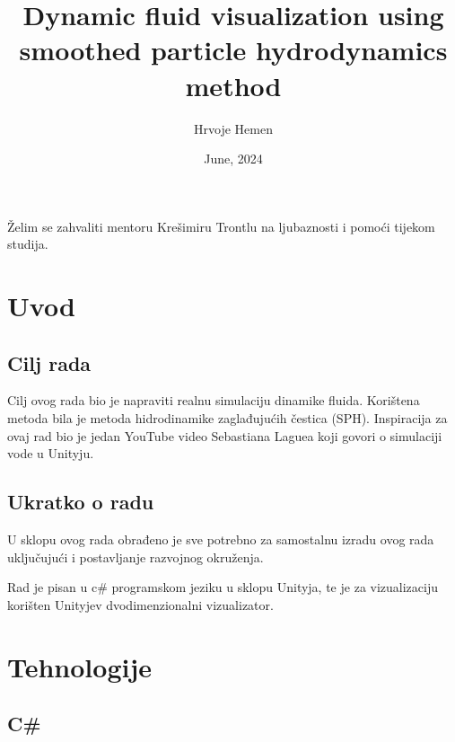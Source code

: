 \documentclass[diplomskirad]{fer}
\title{Dynamic fluid visualization using smoothed particle hydrodynamics method}
\author{Hrvoje Hemen}
\date{June, 2024}
\begin{document}
    \maketitle
    \begin{zahvale}
        Želim se zahvaliti mentoru Krešimiru Trontlu na ljubaznosti i pomoći tijekom studija.
    \end{zahvale}
    \mainmatter
    \tableofcontents


    \chapter{Uvod}\label{ch:uvod}


    \section{Cilj rada}\label{sec:cilj-rada}

    Cilj ovog rada bio je napraviti realnu simulaciju dinamike fluida.
    Korištena metoda bila je metoda hidrodinamike zaglađujućih čestica (SPH).
    Inspiracija za ovaj rad bio je jedan YouTube video Sebastiana Laguea koji govori o simulaciji vode u Unityju.


    \section{Ukratko o radu}\label{sec:ukratko-o-radu}

    U sklopu ovog rada obrađeno je sve potrebno za samostalnu izradu ovog rada uključujući i postavljanje razvojnog okruženja.

    Rad je pisan u c\# programskom jeziku u sklopu Unityja, te je za vizualizaciju korišten Unityjev dvodimenzionalni vizualizator.


    \chapter{Tehnologije}\label{ch:tehnologije}


    \section{C\#}\label{sec:c}
\end{document}
